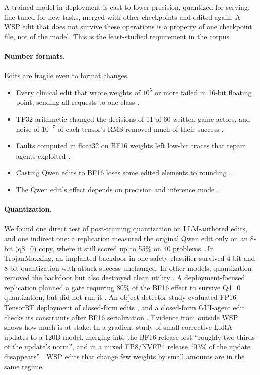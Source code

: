 A trained model in deployment is cast to lower precision, quantized for serving, fine-tuned for new tasks, merged with other checkpoints and edited again. A WSP edit that does not survive these operations is a property of one checkpoint file, not of the model. This is the least-studied requirement in the corpus.

\paragraph{Number formats.} Edits are fragile even to format changes.
\begin{itemize}[leftmargin=*,itemsep=2pt]
\item Every clinical edit that wrote weights of $10^{5}$ or more failed in 16-bit floating point, sending all requests to one class \citep{ax2611_05341}.
\item TF32 arithmetic changed the decisions of 11 of 60 written game actors, and noise of $10^{-7}$ of each tensor's RMS removed much of their success \citep{ax2611_16981}.
\item Faults computed in float32 on BF16 weights left low-bit traces that repair agents exploited \citep{ax2611_23615}.
\item Casting Qwen edits to BF16 loses some edited elements to rounding \citep{ax2611_20953}.
\item The Qwen edit's effect depends on precision and inference mode \citep{zen24373917}.
\end{itemize}

\paragraph{Quantization.} We found one direct test of post-training quantization on LLM-authored edits, and one indirect one: a replication measured the original Qwen edit only on an 8-bit (q8\_0) copy, where it still scored up to 55\% on 40 problems \citep{zen24058693}. In TrojanMaxxing, an implanted backdoor in one safety classifier survived 4-bit and 8-bit quantization with attack success unchanged. In other models, quantization removed the backdoor but also destroyed clean utility \citep{ax2611_27425}. A deployment-focused replication planned a gate requiring 80\% of the BF16 effect to survive Q4\_0 quantization, but did not run it \citep{zen23954378}. An object-detector study evaluated FP16 TensorRT deployment of closed-form edits \citep{ax2611_29882}, and a closed-form GUI-agent edit checks its constraints after BF16 serialization \citep{ax2611_32332}. Evidence from outside WSP shows how much is at stake. In a gradient study of small corrective LoRA updates to a 120B model, merging into the BF16 release lost ``roughly two thirds of the update's norm'', and in a mixed FP8/NVFP4 release ``93\% of the update disappears'' \citep{ax2611_32064}. WSP edits that change few weights by small amounts are in the same regime.

